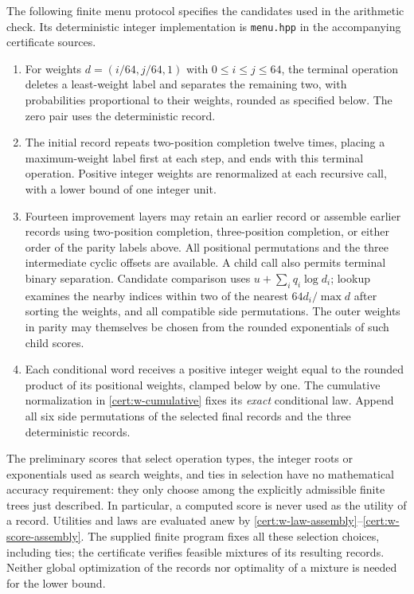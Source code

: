 \documentclass[11pt]{article}
\numberwithin{equation}{section}
\theoremstyle{definition}
\theoremstyle{remark}
\begin{document}
The following finite menu protocol specifies the candidates used in the
arithmetic check.  Its deterministic integer implementation is
\texttt{menu.hpp} in the accompanying certificate sources.
\begin{enumerate}
\item For weights $d=(i/64,j/64,1)$ with $0\le i\le j\le64$, the
terminal operation deletes a least-weight label and separates the remaining
two, with probabilities proportional to their weights, rounded as specified
below.  The zero pair uses the deterministic record.
\item The initial record repeats two-position completion twelve times,
placing a maximum-weight label first at each step, and ends with this
terminal operation.  Positive integer weights are renormalized at each
recursive call, with a lower bound of one integer unit.
\item Fourteen improvement layers may retain an earlier record or assemble
earlier records using two-position completion, three-position completion,
or either order of the parity labels above.  All positional permutations
and the three intermediate cyclic offsets are available.  A child call
also permits terminal binary separation.  Candidate comparison uses
$u+\sum_iq_i\log d_i$; lookup examines the nearby indices within two of
the nearest $64d_i/\max d$ after sorting the weights, and all compatible
side permutations.  The outer weights in parity may themselves be chosen
from the rounded exponentials of such child scores.
\item Each conditional word receives a positive integer weight equal to
the rounded product of its positional weights, clamped below by one.
The cumulative normalization in \eqref{cert:w-cumulative} fixes its
\emph{exact} conditional law.  Append all six side permutations of the
selected final records and the three deterministic records.
\end{enumerate}
The preliminary scores that select operation types, the integer roots or
exponentials used as search weights, and ties in selection have no
mathematical accuracy requirement: they only choose among the explicitly
admissible finite trees just described.  In particular, a computed score
is never used as the utility of a record.  Utilities and laws are evaluated
anew by \eqref{cert:w-law-assembly}--\eqref{cert:w-score-assembly}.
The supplied finite program fixes all these selection choices, including
ties; the certificate verifies feasible mixtures of its resulting records.
Neither global optimization of the records nor optimality of a mixture
is needed for the lower bound.
\end{document}
